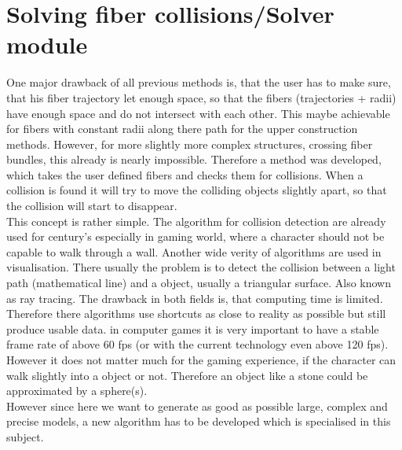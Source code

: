 \section{Solving fiber collisions/Solver module}
\label{sec:Solver}
% 
One major drawback of all previous methods is, that the user has to make sure, that his fiber trajectory let enough space, so that the fibers (trajectories + radii) have enough space and do not intersect with each other.
This maybe achievable for fibers with constant radii along there path for the upper construction methods.
However, for more slightly more complex structures, \eg crossing fiber bundles, this already is nearly impossible.
Therefore a method was developed, which takes the user defined fibers and checks them for collisions.
When a collision is found it will try to move the colliding objects slightly apart, so that the collision will start to disappear.
\\
% 
This concept is rather simple.
The algorithm for collision detection are already used for century's especially in gaming world, where a character \eg should not be capable to walk through a wall. Another wide verity of algorithms are used in visualisation. There usually the problem is to detect the collision between a light path (mathematical line) and a object, usually a triangular surface. Also known as ray tracing.
The drawback in both fields is, that computing time is limited.
Therefore there algorithms use shortcuts as close to reality as possible but still produce usable data. \eg in computer games it is very important to have a stable frame rate of above $\num{60}$ \ac{fps} (or with the current technology even above 120 \ac{fps}).
However it does not matter much for the gaming experience, if the character can walk slightly into a object or not.
Therefore an object like a stone could be approximated by a sphere(s).
\\
%
However since here we want to generate as good as possible large, complex and precise models, a new algorithm has to be developed which is specialised in this subject.
% 
\\[\baselineskip]
%
